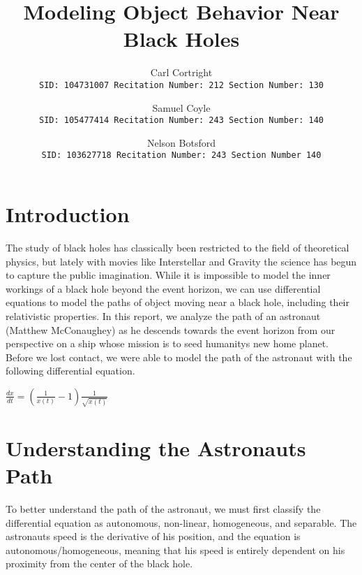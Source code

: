 \documentclass[11pt,english]{article}
\begin{document}
\title{Modeling Object Behavior Near Black Holes}
\author{
  Carl Cortright\\
  \texttt{SID: 104731007 Recitation Number: 212 Section Number: 130}
  \and
  Samuel Coyle\\
  \texttt{SID: 105477414 Recitation Number: 243 Section Number: 140}
  \and
  Nelson Botsford\\
  \texttt{SID: 103627718 Recitation Number: 243 Section Number 140}
}
\maketitle

\section*{Introduction}

The study of black holes has classically been restricted to the field of theoretical physics, but lately with movies like Interstellar and Gravity the science has begun to capture the public imagination. While it is impossible to model the inner workings of a black hole beyond the event horizon, we can use differential equations to model the paths of object moving near a black hole, including their relativistic properties. In this report, we analyze the path of an astronaut (Matthew McConaughey) as he descends towards the event horizon from our perspective on a ship whose mission is to seed humanity\textquotesingle s new home planet. Before we lost contact, we were able to model the path of the astronaut with the following differential equation.

\begin{center}
$\frac{dx}{dt} = (\frac{1}{x(t)} - 1) \frac{1}{\sqrt{x(t)}}$
\end{center}

\section*{Understanding the Astronaut\textquotesingle s Path}

To better understand the path of the astronaut, we must first classify the differential equation as autonomous, non-linear, homogeneous, and separable. The astronaut\textquotesingle s speed is the derivative of his position, and the equation is autonomous/homogeneous, meaning that his speed is entirely dependent on his proximity from the center of the black hole.
\end{document}
